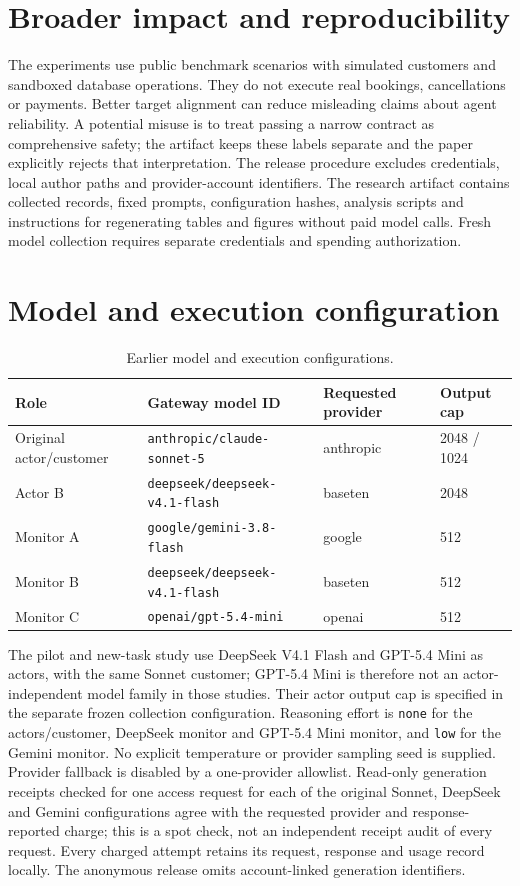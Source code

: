 \documentclass[10pt]{article}
\begin{document}
\section*{Broader impact and reproducibility}
The experiments use public benchmark scenarios with simulated customers and sandboxed database operations. They do not execute real bookings, cancellations or payments. Better target alignment can reduce misleading claims about agent reliability. A potential misuse is to treat passing a narrow contract as comprehensive safety; the artifact keeps these labels separate and the paper explicitly rejects that interpretation. The release procedure excludes credentials, local author paths and provider-account identifiers. The research artifact contains collected records, fixed prompts, configuration hashes, analysis scripts and instructions for regenerating tables and figures without paid model calls. Fresh model collection requires separate credentials and spending authorization.




\appendix
\section{Model and execution configuration}
\label{app:configuration}
\begin{table}[h]
\caption{Earlier model and execution configurations.}\label{tab:earlier-config}
\centering\small
\begin{tabular}{llll}
\toprule
Role & Gateway model ID & Requested provider & Output cap\\
\midrule
Original actor/customer & \texttt{anthropic/claude-sonnet-5} & anthropic & 2048 / 1024\\
Actor B & \texttt{deepseek/deepseek-v4.1-flash} & baseten & 2048\\
Monitor A & \texttt{google/gemini-3.8-flash} & google & 512\\
Monitor B & \texttt{deepseek/deepseek-v4.1-flash} & baseten & 512\\
Monitor C & \texttt{openai/gpt-5.4-mini} & openai & 512\\
\bottomrule
\end{tabular}
\end{table}
The pilot and new-task study use DeepSeek V4.1 Flash and GPT-5.4 Mini as actors, with the same Sonnet customer; GPT-5.4 Mini is therefore not an actor-independent model family in those studies. Their actor output cap is specified in the separate frozen collection configuration. Reasoning effort is \texttt{none} for the actors/customer, DeepSeek monitor and GPT-5.4 Mini monitor, and \texttt{low} for the Gemini monitor. No explicit temperature or provider sampling seed is supplied. Provider fallback is disabled by a one-provider allowlist. Read-only generation receipts checked for one access request for each of the original Sonnet, DeepSeek and Gemini configurations agree with the requested provider and response-reported charge; this is a spot check, not an independent receipt audit of every request. Every charged attempt retains its request, response and usage record locally. The anonymous release omits account-linked generation identifiers.
\end{document}
